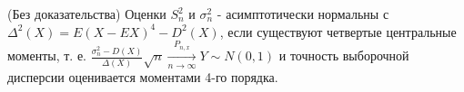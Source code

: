\begin{proposition}
  (Без доказательства) Оценки $S^2_n$ и $\sigma^2_n$ - асимптотически нормальны с $\Delta^2(X) = E(X - EX)^4 - D^2(X)$, если существуют четвертые центральные моменты,
  т. е. $\frac{\sigma^2_n - D(X)}{\Delta(X)}\sqrt{n} \xrightarrow[n \to \infty]{P_{n, x}} Y \sim N(0, 1)$ и точность выборочной дисперсии оценивается моментами 4-го порядка.
\end{proposition}

